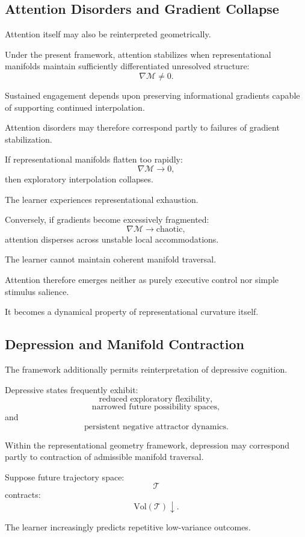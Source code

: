 \documentclass[12pt,a4paper]{article}
\begin{document}
\subsection{Attention Disorders and Gradient Collapse}

Attention itself may also be reinterpreted geometrically.

Under the present framework, attention stabilizes when representational manifolds maintain sufficiently differentiated unresolved structure:
\[
\nabla \mathcal{M}
\neq
0.
\]

Sustained engagement depends upon preserving informational gradients capable of supporting continued interpolation.

Attention disorders may therefore correspond partly to failures of gradient stabilization.

If representational manifolds flatten too rapidly:
\[
\nabla \mathcal{M}
\rightarrow
0,
\]
then exploratory interpolation collapses.

The learner experiences representational exhaustion.

Conversely, if gradients become excessively fragmented:
\[
\nabla \mathcal{M}
\rightarrow
\text{chaotic},
\]
attention disperses across unstable local accommodations.

The learner cannot maintain coherent manifold traversal.

Attention therefore emerges neither as purely executive control nor simple stimulus salience.

It becomes a dynamical property of representational curvature itself.

\subsection{Depression and Manifold Contraction}

The framework additionally permits reinterpretation of depressive cognition.

Depressive states frequently exhibit:
\[
\text{reduced exploratory flexibility},
\]
\[
\text{narrowed future possibility spaces},
\]
and
\[
\text{persistent negative attractor dynamics}.
\]

Within the representational geometry framework, depression may correspond partly to contraction of admissible manifold traversal.

Suppose future trajectory space:
\[
\mathcal{T}
\]
contracts:
\[
\text{Vol}(\mathcal{T})
\downarrow.
\]

The learner increasingly predicts repetitive low-variance outcomes.
\end{document}

